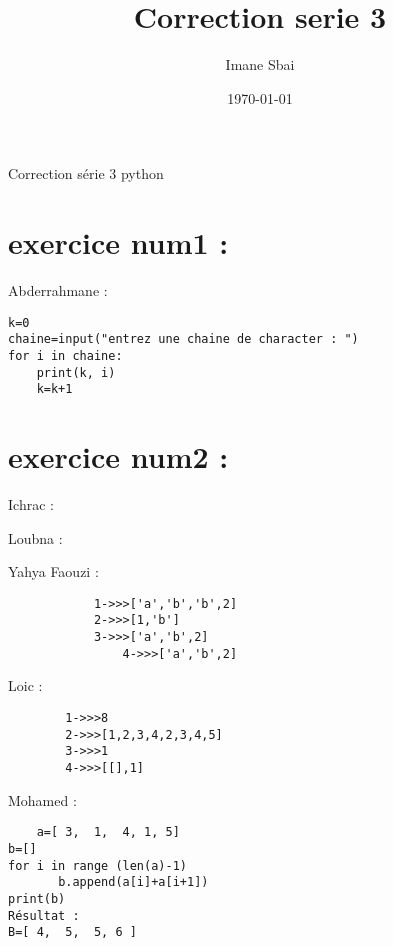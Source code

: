 \documentclass{article}
\title{Correction serie 3}
\author{Imane Sbai}
\date {\today}
\begin{document}
\begin{titlepage}
    \begin{center}
Correction s\'{e}rie 3 python
    \end{center}
\end{titlepage}

\section{exercice num1 :}
	\begin{center}
    		Abderrahmane :
	\end{center} 
	
\begin{lstlisting}
k=0
chaine=input("entrez une chaine de character : ")
for i in chaine:
	print(k, i)
	k=k+1
\end{lstlisting}
\section{exercice num2 :}

	\begin{center}
    		Ichrac :
	\end{center}
	
	
	\begin{center}
    		Loubna :
	\end{center} 
	

        \begin{center}
    		 Yahya Faouzi :
	\end{center}    	  
        	
    	\begin{verbatim}
        	1->>>['a','b','b',2]
	    	2->>>[1,'b']
	    	3->>>['a','b',2]
                4->>>['a','b',2]

        \end{verbatim}
         
	\begin{center}
    		Loic :
	\end{center} 
	
	\begin{verbatim}
		1->>>8
		2->>>[1,2,3,4,2,3,4,5]
		3->>>1
		4->>>[[],1]
	\end{verbatim}
	
	\begin{center}
    		Mohamed :
	\end{center}
	
	\begin{verbatim}
	a=[ 3,  1,  4, 1, 5]
b=[]
for i in range (len(a)-1)
       b.append(a[i]+a[i+1])
print(b)
Résultat :
B=[ 4,  5,  5, 6 ]
	\end{verbatim}
\end{document}
